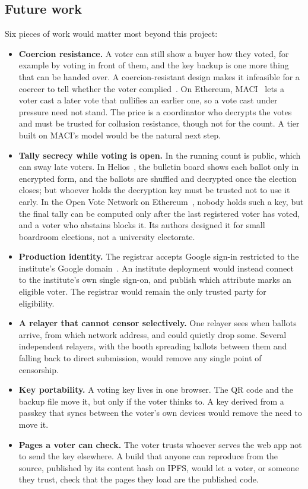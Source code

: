 \subsection{Future work}

Six pieces of work would matter most beyond this project:

\begin{itemize}
  \item \textbf{Coercion resistance.} A voter can still show a buyer how they
        voted, for example by voting in front of them, and the key backup is one
        more thing that can be handed over. A coercion-resistant design makes
        it infeasible for a coercer to tell whether the voter
        complied~\cite{jcj}. On Ethereum, MACI~\cite{maci} lets a voter cast a
        later vote that nullifies an earlier one, so a vote cast under pressure
        need not stand. The price is a coordinator who decrypts the votes and must
        be trusted for collusion resistance, though not for the count. A tier
        built on MACI's model would be the natural next step.
  \item \textbf{Tally secrecy while voting is open.} In \projectname{} the running count is
        public, which can sway late voters. In Helios~\cite{helios}, the
        bulletin board shows each ballot only in encrypted form, and the
        ballots are shuffled and decrypted once the election closes; but whoever holds the decryption
        key must be trusted not to use it early. In the Open Vote Network on
        Ethereum~\cite{openvote}, nobody holds such a key, but the final tally
        can be computed only after the last registered voter has voted, and a
        voter who abstains blocks it. Its authors designed it for small
        boardroom elections, not a university electorate.
  \item \textbf{Production identity.} The registrar accepts Google sign-in
        restricted to the institute's Google domain~\cite{googleidtoken}. An
        institute deployment would instead connect to the institute's own
        single sign-on, and publish which attribute marks an eligible voter.
        The registrar would remain the only trusted party for eligibility.
  \item \textbf{A relayer that cannot censor selectively.} One relayer sees
        when ballots arrive, from which network address, and could quietly
        drop some. Several independent relayers, with the booth spreading
        ballots between them and falling back to direct submission, would
        remove any single point of censorship.
  \item \textbf{Key portability.} A voting key lives in one browser. The QR code
        and the backup file move it, but only if the voter thinks to. A key
        derived from a passkey that syncs between the voter's own devices would
        remove the need to move it.
  \item \textbf{Pages a voter can check.} The voter trusts whoever serves the
        web app not to send the key elsewhere. A build that anyone can
        reproduce from the source, published by its content hash on IPFS,
        would let a voter, or someone they trust, check that the pages they
        load are the published code.
\end{itemize}
